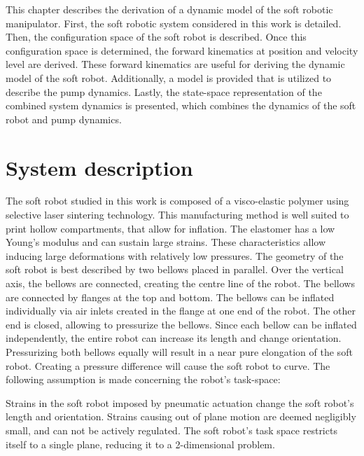 \label{chap2}

This chapter describes the derivation of a dynamic model of the soft robotic manipulator. First, the soft robotic system considered in this work is detailed. Then, the configuration space of the soft robot is described. Once this configuration space is determined, the forward kinematics at position and velocity level are derived. These forward kinematics are useful for deriving the dynamic model of the soft robot. Additionally, a model is provided that is utilized to describe the pump dynamics. Lastly, the state-space representation of the combined system dynamics is presented, which combines the dynamics of the soft robot and pump dynamics.



\section{System description}

The soft robot studied in this work is composed of a visco-elastic polymer using selective laser sintering technology. This manufacturing method is well suited to print hollow compartments, that allow for inflation. The elastomer has a low Young's modulus and can sustain large strains. These characteristics allow inducing large deformations with relatively low pressures. The geometry of the soft robot is best described by two bellows placed in parallel. Over the vertical axis, the bellows are connected, creating the centre line of the robot. The bellows are connected by flanges at the top and bottom. The bellows can be inflated individually via air inlets created in the flange at one end of the robot. The other end is closed, allowing to pressurize the bellows. Since each bellow can be inflated independently, the entire robot can increase its length and change orientation. Pressurizing both bellows equally will result in a near pure elongation of the soft robot. Creating a pressure difference will cause the soft robot to curve. The following assumption is made concerning the robot's task-space:

\begin{theorem}
Strains in the soft robot imposed by pneumatic actuation change the soft robot's length and orientation. Strains causing out of plane motion are deemed negligibly small, and can not be actively regulated. The soft robot's task space restricts itself to a single plane, reducing it to a 2-dimensional problem.


\end{theorem}

